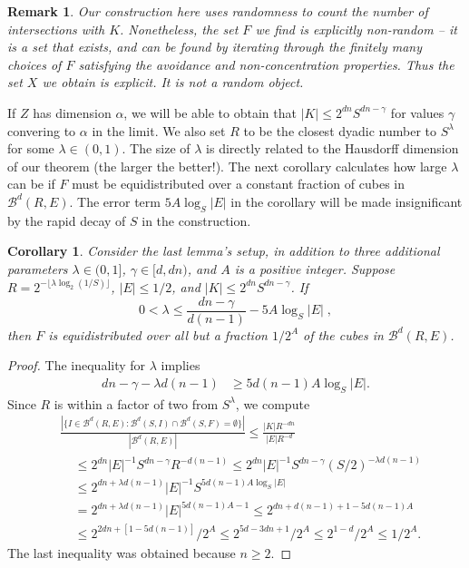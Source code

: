 \documentclass{article}
\theoremstyle{plain}
\newtheorem{corollary}{Corollary}
\theoremstyle{plain}
\newtheorem*{remark}{Remark}
\begin{document}
\begin{remark}
	Our construction here uses randomness to count the number of intersections with $K$. Nonetheless, the set $F$ we find is explicitly non-random -- it is a set that exists, and can be found by iterating through the finitely many choices of $F$ satisfying the avoidance and non-concentration properties. Thus the set $X$ we obtain is explicit. It is not a random object.
\end{remark}

If $Z$ has dimension $\alpha$, we will be able to obtain that $|K| \leq 2^{dn} S^{dn-\gamma}$ for values $\gamma$ convering to $\alpha$ in the limit. We also set $R$ to be the closest dyadic number to $S^\lambda$ for some $\lambda \in (0,1)$. The size of $\lambda$ is directly related to the Hausdorff dimension of our theorem (the larger the better!). The next corollary calculates how large $\lambda$ can be if $F$ must be equidistributed over a constant fraction of cubes in $\mathcal{B}^d(R,E)$. The error term $5A \log_S |E|$ in the corollary will be made insignificant by the rapid decay of $S$ in the construction.

\begin{corollary}
	Consider the last lemma's setup, in addition to three additional parameters $\lambda \in (0,1]$, $\gamma \in [d,dn)$, and $A$ is a positive integer. Suppose $R = 2^{- \lfloor \lambda \log_2(1/S) \rfloor}$, $|E| \leq 1/2$, and $|K| \leq 2^{dn} S^{dn-\gamma}$. If
	\[ 0 < \lambda \leq \frac{dn - \gamma}{d(n-1)} - 5 A \log_S |E|\; , \]
	then $F$ is equidistributed over all but a fraction $1/2^A$ of the cubes in $\mathcal{B}^d(R,E)$.
\end{corollary}
\begin{proof}
	The inequality for $\lambda$ implies
	\begin{align*}
		dn - \gamma - \lambda d(n-1) &\geq 5d(n-1) A \log_S |E|.
	\end{align*}
	Since $R$ is within a factor of two from $S^\lambda$, we compute
	\begin{align*}
		&\frac{|\{ I \in \mathcal{B}^d(R,E): \mathcal{B}^d(S,I) \cap \mathcal{B}^d(S,F) = \emptyset \}|}{|\mathcal{B}^d(R,E)|} \leq \frac{|K| R^{-dn}}{|E|R^{-d}}\\
		&\ \ \ \ \ \leq 2^{dn} |E|^{-1} S^{dn - \gamma} R^{-d(n-1)} \leq 2^{dn} |E|^{-1} S^{dn - \gamma} (S/2)^{- \lambda d(n-1)}\\
		&\ \ \ \ \ \leq 2^{dn + \lambda d(n-1)} |E|^{-1} S^{5d(n-1) A \log_S|E|}\\
		&\ \ \ \ \ = 2^{dn + \lambda d(n-1)} |E|^{5d(n-1) A - 1} \leq 2^{dn + d(n-1) + 1 - 5d(n-1)A}\\
		&\ \ \ \ \ \leq 2^{2dn + [1 - 5d(n-1)]}/2^A \leq 2^{5d-3dn + 1}/2^A \leq 2^{1 - d}/2^A \leq 1/2^A.
	\end{align*}
	The last inequality was obtained because $n \geq 2$.
\end{proof}
\end{document}
